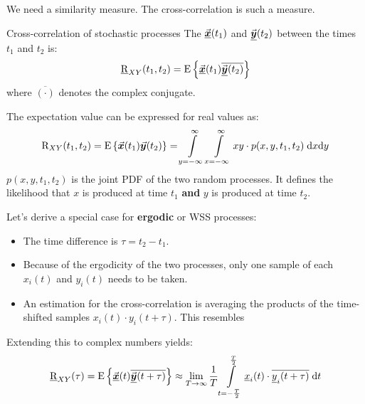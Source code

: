 \begin{refsection}
We need a similarity measure. The cross-correlation is such a measure.

\begin{definition}{Cross-correlation of stochastic processes}
	The   $\vec{\bm{\underline{x}}}(t_1)$ and $\vec{\bm{\underline{y}}}(t_2)$ between the times $t_1$ and $t_2$ is:
	\begin{equation}
		\underline{\mathrm{R}}_{XY}(t_1, t_2) = \mathrm{E}\left\{ \vec{\bm{\underline{x}}}(t_1) \overline{\vec{\bm{\underline{y}}}(t_2)} \right\}
	\end{equation}%
	where $\overline{\left(\cdot\right)}$ denotes the complex conjugate.
\end{definition}

The expectation value can be expressed for real values as:
\begin{equation}
	\mathrm{R}_{XY}(t_1, t_2) = \mathrm{E}\left\{ \vec{\bm{x}}(t_1) \vec{\bm{y}}(t_2) \right\} = \int\limits_{y = -\infty}^{\infty} \int\limits_{x = -\infty}^{\infty} x y \cdot p(x, y, t_1, t_2) \; \mathrm{d} x \mathrm{d} y
\end{equation}
$p(x, y, t_1, t_2)$ is the joint \ac{PDF} of the two random processes. It defines the likelihood that $x$ is produced at time $t_1$ \textbf{and} $y$ is produced at time $t_2$.

Let's derive a special case for \textbf{ergodic} or \ac{WSS} processes:
\begin{itemize}
	\item The time difference is $\tau = t_2 - t_1$.
	\item Because of the ergodicity of the two processes, only one sample of each $x_i(t)$ and $y_i(t)$ needs to be taken.
	\item An estimation for the cross-correlation is averaging the products of the time-shifted samples $x_i(t) \cdot y_i(t+\tau)$. This resembles
\end{itemize}
Extending this to complex numbers yields:
\begin{equation}
	\underline{\mathrm{R}}_{XY}(\tau) = \mathrm{E}\left\{ \vec{\bm{\underline{x}}}(t) \overline{\vec{\bm{\underline{y}}}(t+\tau)} \right\} \approx \lim\limits_{T \rightarrow \infty} \frac{1}{T} \int\limits_{t = -\frac{T}{2}}^{\frac{T}{2}} \underline{x}_i(t) \cdot \overline{\underline{y}_i(t+\tau)} \; \mathrm{d} t
\end{equation}


\end{refsection}
